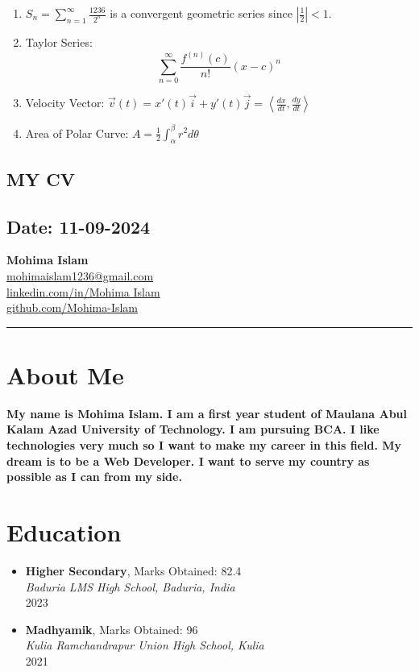 \documentclass[12pt]{article}
\begin{document}
\begin{enumerate}
    \item $S_n = \sum_{n=1}^{\infty} \frac{1236}{2^n}$ is a convergent geometric series since $\left|\frac{1}{2}\right| < 1$.
    
    \item Taylor Series:
    \[
    \sum_{n=0}^{\infty} \frac{f^{(n)}(c)}{n!} (x - c)^n
    \]
    
    \item Velocity Vector: $\vec{v}(t) = x'(t)\vec{i} + y'(t)\vec{j} = \left\langle \frac{dx}{dt}, \frac{dy}{dt} \right\rangle$
    
    \item Area of Polar Curve: $A = \frac{1}{2} \int_{\alpha}^{\beta} r^2 d\theta$
\end{enumerate}
\newpage
\subsection*{MY CV}
\subsection*{Date: 11-09-2024}
\begin{center}
    {\LARGE \textbf{Mohima Islam}} \\
    \vspace{2mm}
    \href{mailto:mohimaislam1236@gmail.com}{mohimaislam1236@gmail.com} \\
    \href{https://www.linkedin.com/in/Mohima Islam}{linkedin.com/in/Mohima Islam} \\
    \href{https://github.com/Mohima-Islam}{github.com/Mohima-Islam} \\
    \vspace{2mm}
    \hrule
\end{center}
\section*{About Me}
\textbf{My name is Mohima Islam. I am a first year student of Maulana Abul Kalam Azad University of Technology. I am pursuing BCA. I like technologies very much so I want to make my career in this field. My dream is to be a Web Developer. I want to serve my country as possible as I can from my side. }
\section*{Education}
\begin{itemize}[leftmargin=0.5cm]
    \item \textbf{Higher Secondary}, Marks Obtained: 82.4 \\
    \textit{Baduria LMS High School, Baduria, India} \\
    2023
    \item \textbf{Madhyamik}, Marks Obtained: 96\\
    \textit{Kulia Ramchandrapur Union High School, Kulia}\\
    2021
\end{itemize}
\end{document}

